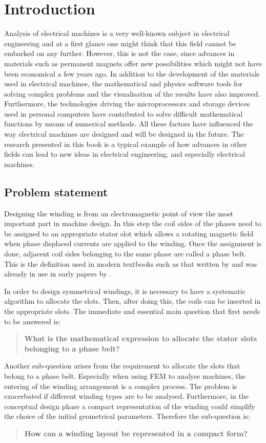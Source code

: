 \chapter{Introduction}
Analysis of electrical machines is a very well-known subject in electrical engineering and at a first glance one might think that this field cannot be embarked on any further. However, this is not the case, since advances in materials such as permanent magnets offer new possibilities which might not have been economical a few years ago. In addition to the development of the materials used in electrical machines, the mathematical and physics software tools for solving complex problems and the visualisation of the results have also improved. Furthermore, the technologies driving the microprocessors and storage devices used in personal computers have contributed to solve difficult mathematical functions by means of numerical methods. All these factors have influenced the way electrical machines are designed and will be designed in the future. The research presented in this book is a typical example of how advances in other fields can lead to new ideas in electrical engineering, and especially electrical machines. 

\section{Problem statement}
\label{sec:problem_statement}
Designing the winding is from an electromagnetic point of view the most important part in machine design. In this step the coil sides of the phases need to be assigned to an appropriate stator slot which allows a rotating magnetic field when phase displaced currents are applied to the winding. Once the assignment is done, adjacent coil sides belonging to the same phase are called a phase belt. This is the definition used in modern textbooks such as that written by \cite{REF-00330} and was already in use in early papers by \cite{REF-00835}.

In order to design symmetrical windings, it is necessary to have a systematic algorithm to allocate the slots. Then, after doing this, the coils can be inserted in the appropriate slots. The immediate and essential main question that first needs to be answered is: 
\begin{quote}
\textbf{What is the mathematical expression to allocate the stator slots belonging to a phase belt?} 
\end{quote}

Another sub-question arises from the requirement to allocate the slots that belong to a phase belt. Especially when using FEM to analyse machines, the entering of the winding arrangement is a complex process. The problem is exacerbated if different winding types are to be analysed. Furthermore, in the conceptual design phase a compact representation of the winding could simplify the choice of the initial geometrical parameters. Therefore the sub-question is: 
\begin{quote}
\textbf{How can a winding layout be represented in a compact form?} 
\end{quote}

